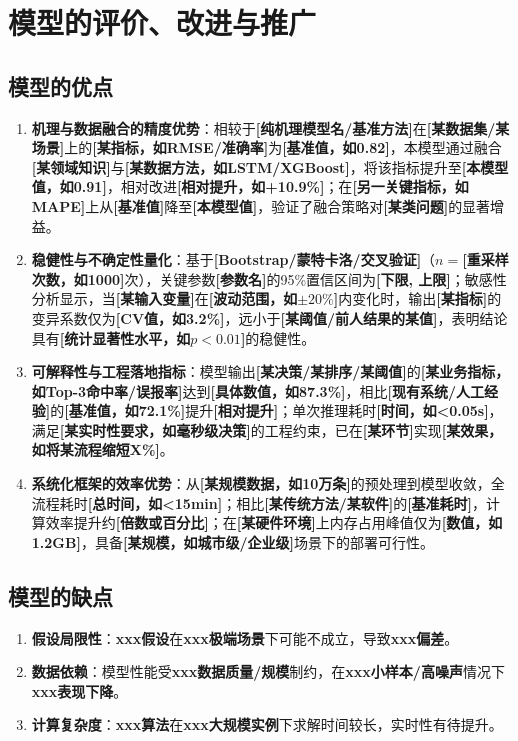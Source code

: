 \documentclass[draft,12pt,a4paper]{ctexart}
\theoremstyle{definition}
\begin{document}
\section{模型的评价、改进与推广}

\subsection{模型的优点}
\begin{enumerate}[itemsep=1pt]
  \item \textbf{机理与数据融合的精度优势}：相较于\textbf{[纯机理模型名/基准方法]}在\textbf{[某数据集/某场景]}上的\textbf{[某指标，如RMSE/准确率]}为\textbf{[基准值，如0.82]}，本模型通过融合\textbf{[某领域知识]}与\textbf{[某数据方法，如LSTM/XGBoost]}，将该指标提升至\textbf{[本模型值，如0.91]}，相对改进\textbf{[相对提升，如+10.9\%]}；在\textbf{[另一关键指标，如MAPE]}上从\textbf{[基准值]}降至\textbf{[本模型值]}，验证了融合策略对\textbf{[某类问题]}的显著增益。
  
  \item \textbf{稳健性与不确定性量化}：基于\textbf{[Bootstrap/蒙特卡洛/交叉验证]}（$n=$\textbf{[重采样次数，如1000]}次），关键参数\textbf{[参数名]}的95\%置信区间为\textbf{[下限, 上限]}；敏感性分析显示，当\textbf{[某输入变量]}在\textbf{[波动范围，如$\pm20\%$]}内变化时，输出\textbf{[某指标]}的变异系数仅为\textbf{[CV值，如3.2\%]}，远小于\textbf{[某阈值/前人结果的某值]}，表明结论具有\textbf{[统计显著性水平，如$p<0.01$]}的稳健性。
  
  \item \textbf{可解释性与工程落地指标}：模型输出\textbf{[某决策/某排序/某阈值]}的\textbf{[某业务指标，如Top-3命中率/误报率]}达到\textbf{[具体数值，如87.3\%]}，相比\textbf{[现有系统/人工经验]}的\textbf{[基准值，如72.1\%]}提升\textbf{[相对提升]}；单次推理耗时\textbf{[时间，如<0.05s]}，满足\textbf{[某实时性要求，如毫秒级决策]}的工程约束，已在\textbf{[某环节]}实现\textbf{[某效果，如将某流程缩短X\%]}。
  
  \item \textbf{系统化框架的效率优势}：从\textbf{[某规模数据，如10万条]}的预处理到模型收敛，全流程耗时\textbf{[总时间，如<15min]}；相比\textbf{[某传统方法/某软件]}的\textbf{[基准耗时]}，计算效率提升约\textbf{[倍数或百分比]}；在\textbf{[某硬件环境]}上内存占用峰值仅为\textbf{[数值，如1.2GB]}，具备\textbf{[某规模，如城市级/企业级]}场景下的部署可行性。
\end{enumerate}
\subsection{模型的缺点}
\begin{enumerate}[itemsep=1pt]
  \item \textbf{假设局限性}：\textbf{xxx假设}在\textbf{xxx极端场景}下可能不成立，导致\textbf{xxx偏差}。
  \item \textbf{数据依赖}：模型性能受\textbf{xxx数据质量/规模}制约，在\textbf{xxx小样本/高噪声}情况下\textbf{xxx表现下降}。
  \item \textbf{计算复杂度}：\textbf{xxx算法}在\textbf{xxx大规模实例}下求解时间较长，实时性有待提升。
\end{enumerate}
\end{document}
